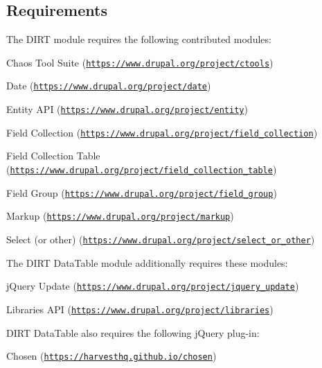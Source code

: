 \subsection*{Requirements}

The D\+I\+RT module requires the following contributed modules\+:


\begin{DoxyItemize}
\item Chaos Tool Suite (\href{https://www.drupal.org/project/ctools}{\tt https\+://www.\+drupal.\+org/project/ctools})
\item Date (\href{https://www.drupal.org/project/date}{\tt https\+://www.\+drupal.\+org/project/date})
\item Entity A\+PI (\href{https://www.drupal.org/project/entity}{\tt https\+://www.\+drupal.\+org/project/entity})
\item Field Collection (\href{https://www.drupal.org/project/field_collection}{\tt https\+://www.\+drupal.\+org/project/field\+\_\+collection})
\item Field Collection Table (\href{https://www.drupal.org/project/field_collection_table}{\tt https\+://www.\+drupal.\+org/project/field\+\_\+collection\+\_\+table})
\item Field Group (\href{https://www.drupal.org/project/field_group}{\tt https\+://www.\+drupal.\+org/project/field\+\_\+group})
\item Markup (\href{https://www.drupal.org/project/markup}{\tt https\+://www.\+drupal.\+org/project/markup})
\item Select (or other) (\href{https://www.drupal.org/project/select_or_other}{\tt https\+://www.\+drupal.\+org/project/select\+\_\+or\+\_\+other})
\end{DoxyItemize}

The D\+I\+RT Data\+Table module additionally requires these modules\+:


\begin{DoxyItemize}
\item j\+Query Update (\href{https://www.drupal.org/project/jquery_update}{\tt https\+://www.\+drupal.\+org/project/jquery\+\_\+update})
\item Libraries A\+PI (\href{https://www.drupal.org/project/libraries}{\tt https\+://www.\+drupal.\+org/project/libraries})
\end{DoxyItemize}

D\+I\+RT Data\+Table also requires the following j\+Query plug-\/in\+:


\begin{DoxyItemize}
\item Chosen (\href{https://harvesthq.github.io/chosen}{\tt https\+://harvesthq.\+github.\+io/chosen})
\end{DoxyItemize}

